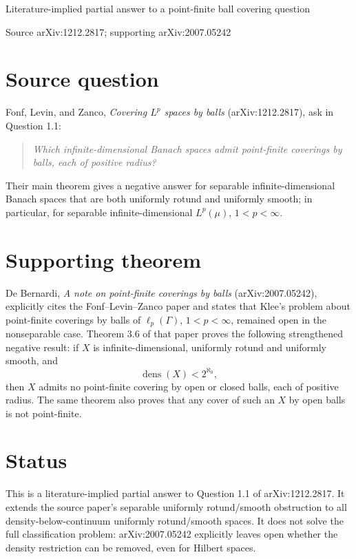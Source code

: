 \documentclass[11pt]{article}
\begin{document}
\begin{center}
{\Large Literature-implied partial answer to a point-finite ball covering question}

\vspace{0.4em}
{\large Source arXiv:1212.2817; supporting arXiv:2007.05242}
\end{center}

\section*{Source question}

Fonf, Levin, and Zanco, \emph{Covering \(L^p\) spaces by balls}
(arXiv:1212.2817), ask in Question 1.1:
\begin{quote}
\emph{Which infinite-dimensional Banach spaces admit point-finite coverings by
balls, each of positive radius?}
\end{quote}
Their main theorem gives a negative answer for separable infinite-dimensional
Banach spaces that are both uniformly rotund and uniformly smooth; in
particular, for separable infinite-dimensional \(L^p(\mu)\), \(1<p<\infty\).

\section*{Supporting theorem}

De Bernardi, \emph{A note on point-finite coverings by balls}
(arXiv:2007.05242), explicitly cites the Fonf--Levin--Zanco paper and states
that Klee's problem about point-finite coverings by balls of
\(\ell_p(\Gamma)\), \(1<p<\infty\), remained open in the nonseparable case.
Theorem 3.6 of that paper proves the following strengthened negative result:
if \(X\) is infinite-dimensional, uniformly rotund and uniformly smooth, and
\[
\operatorname{dens}(X)<2^{\aleph_0},
\]
then \(X\) admits no point-finite covering by open or closed balls, each of
positive radius.  The same theorem also proves that any cover of such an
\(X\) by open balls is not point-finite.

\section*{Status}

This is a literature-implied partial answer to Question 1.1 of arXiv:1212.2817.
It extends the source paper's separable uniformly rotund/smooth obstruction to
all density-below-continuum uniformly rotund/smooth spaces.  It does not solve
the full classification problem: arXiv:2007.05242 explicitly leaves open
whether the density restriction can be removed, even for Hilbert spaces.
\end{document}
